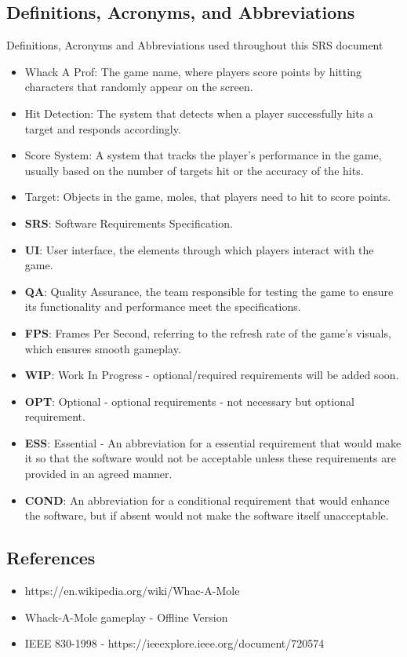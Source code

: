 \documentclass{article}
\begin{document}
\subsection{Definitions, Acronyms, and Abbreviations}
    Definitions, Acronyms and Abbreviations used throughout this SRS document
\begin{itemize}
    \item Whack A Prof: The game name, where players score points by hitting characters that randomly appear on the screen.
    \item Hit Detection: The system that detects when a player successfully hits a target and responds accordingly.
    \item Score System: A system that tracks the player's performance in the game, usually based on the number of targets hit or the accuracy of the hits.
    \item Target: Objects in the game, moles, that players need to hit to score points.
    \item \textbf{SRS}: Software Requirements Specification.
    \item \textbf{UI}: User interface, the elements through which players interact with the game.
    \item \textbf{QA}: Quality Assurance, the team responsible for testing the game to ensure its functionality and performance meet the specifications.
    \item \textbf{FPS}: Frames Per Second, referring to the refresh rate of the game's visuals, which ensures smooth gameplay.
    \item \textbf{WIP}: Work In Progress - optional/required requirements will be added soon.
    \item \textbf{OPT}: Optional - optional requirements -  not necessary but optional requirement.
    \item \textbf{ESS}: Essential - An abbreviation for a essential requirement that would make it so that the software would not be acceptable unless these requirements are provided in an agreed manner.
    \item \textbf{COND}: An abbreviation for a conditional requirement that would enhance the software, but if absent would not make the software itself unacceptable.

\end{itemize}

\subsection{References}
\begin{itemize}
    \item https://en.wikipedia.org/wiki/Whac-A-Mole
    \item Whack-A-Mole gameplay - Offline Version
    \item IEEE 830-1998 - https://ieeexplore.ieee.org/document/720574 
\end{itemize}
\end{document}
